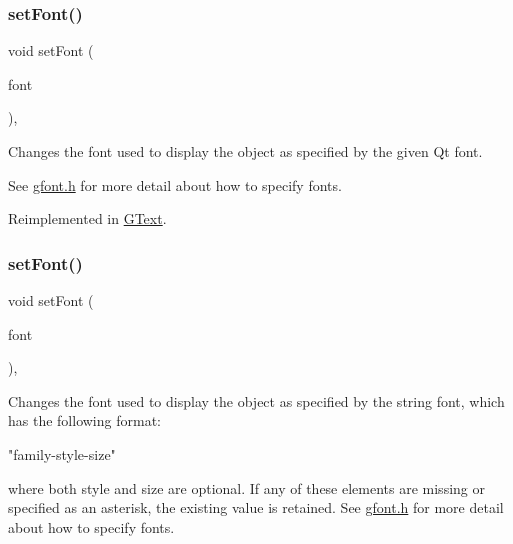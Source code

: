 \subsubsection{\texorpdfstring{set\+Font()}{setFont()}\hspace{0.1cm}{\footnotesize\ttfamily [1/2]}}
{\footnotesize\ttfamily void set\+Font (\begin{DoxyParamCaption}\item[{const Q\+Font \&}]{font }\end{DoxyParamCaption})\hspace{0.3cm}{\ttfamily [virtual]}, {\ttfamily [inherited]}}



Changes the font used to display the object as specified by the given Qt font. 

See \mbox{\hyperlink{gfont_8h_source}{gfont.\+h}} for more detail about how to specify fonts. 

Reimplemented in \mbox{\hyperlink{classsgl_1_1GText_ad1d75b3840a41ba7d1e8a921696dc684}{G\+Text}}.

\mbox{\label{classsgl_1_1GObject_a8e096e8818d838aceae1d46d58fb3a7b}} 
\subsubsection{\texorpdfstring{set\+Font()}{setFont()}\hspace{0.1cm}{\footnotesize\ttfamily [2/2]}}
{\footnotesize\ttfamily void set\+Font (\begin{DoxyParamCaption}\item[{const std\+::string \&}]{font }\end{DoxyParamCaption})\hspace{0.3cm}{\ttfamily [virtual]}, {\ttfamily [inherited]}}



Changes the font used to display the object as specified by the string {\ttfamily font}, which has the following format\+: 


\begin{DoxyPre}
"family-style-size"
\end{DoxyPre}


where both {\ttfamily style} and {\ttfamily size} are optional. If any of these elements are missing or specified as an asterisk, the existing value is retained. See \mbox{\hyperlink{gfont_8h_source}{gfont.\+h}} for more detail about how to specify fonts. 

